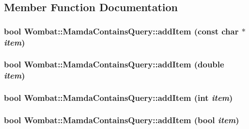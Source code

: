 \subsection{Member Function Documentation}
\hypertarget{classWombat_1_1MamdaContainsQuery_b64723071e2bf2788c31ef4ab848da31}{
\subsubsection[addItem]{\setlength{\rightskip}{0pt plus 5cm}bool Wombat::Mamda\-Contains\-Query::add\-Item (const char $\ast$ {\em item})}}
\label{classWombat_1_1MamdaContainsQuery_b64723071e2bf2788c31ef4ab848da31}


\hypertarget{classWombat_1_1MamdaContainsQuery_30f8253e507e790ab50e2816ab508d1c}{
\subsubsection[addItem]{\setlength{\rightskip}{0pt plus 5cm}bool Wombat::Mamda\-Contains\-Query::add\-Item (double {\em item})}}
\label{classWombat_1_1MamdaContainsQuery_30f8253e507e790ab50e2816ab508d1c}


\hypertarget{classWombat_1_1MamdaContainsQuery_8912e36d2a3b4c4a9959014ee15f0543}{
\subsubsection[addItem]{\setlength{\rightskip}{0pt plus 5cm}bool Wombat::Mamda\-Contains\-Query::add\-Item (int {\em item})}}
\label{classWombat_1_1MamdaContainsQuery_8912e36d2a3b4c4a9959014ee15f0543}


\hypertarget{classWombat_1_1MamdaContainsQuery_75b36aa589057f0b2358e3d2a750edf7}{
\subsubsection[addItem]{\setlength{\rightskip}{0pt plus 5cm}bool Wombat::Mamda\-Contains\-Query::add\-Item (bool {\em item})}}
\label{classWombat_1_1MamdaContainsQuery_75b36aa589057f0b2358e3d2a750edf7}


